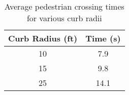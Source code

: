 \begin{table}[h]
\centering
    \begin{tabular}{cc}
    Curb Radius (ft) & Time (s) \\ \hline
    10                 & \phantom{0}7.9                             \\
    15                 & \phantom{0}9.8                             \\
    25                 & 14.1                            \\
    \end{tabular}
    \caption{Average pedestrian crossing times for various curb radii}\label{table:cross-time-vs-radius}
\end{table}